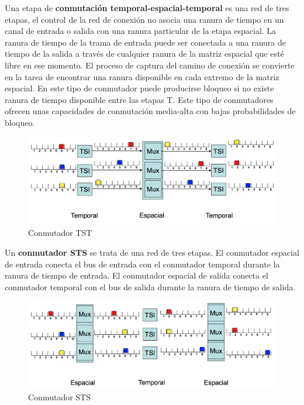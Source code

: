 \documentclass[10pt,portrait, twocolumn]{article}
\begin{document}
Una etapa de \textbf{conmutación temporal-espacial-temporal} es una red de tres etapas, el control de la red de conexión no asocia una ranura de tiempo en un canal de entrada o salida con una ranura particular de la etapa espacial. La ranura de tiempo de la trama de entrada puede ser conectada a una ranura de tiempo de la salida a través de cualquier ranura de la matriz espacial que esté libre en ese momento. El proceso de captura del camino de conexión se convierte en la tarea de encontrar una ranura disponible en cada extremo de la matriz espacial. En este tipo de conmutador puede producirse bloqueo si no existe ranura de tiempo disponible entre las etapas T. Este tipo de conmutadores ofrecen unas capacidades de conmutación media-alta con bajas probabilidades de bloqueo.

	\begin{figure}[!ht]
 		\centering
  		 \includegraphics[scale = 0.4]{images/TST}
		\caption{Conmutador TST}
	\end{figure}

Un \textbf{conmutador STS} se trata de una red de tres etapas. El conmutador espacial de entrada conecta el bus de entrada con el conmutador temporal durante la ranura de tiempo de entrada. El conmutador espacial de salida conecta el conmutador temporal con el bus de salida durante la ranura de tiempo de salida.

	\begin{figure}[!ht]
 		\centering
  		 \includegraphics[scale = 0.4]{images/STS}
		\caption{Conmutador STS}
	\end{figure}

	
	
	




\end{document}
